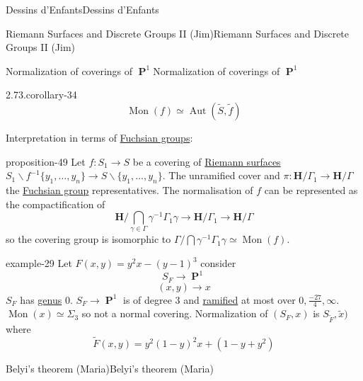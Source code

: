 \documentclass[10pt,]{book}
\numberwithin{equation}{section}
\newcommand{\inv}{^{-1}}
\newcommand{\HH}{\mathbf{H}}
\DeclareMathOperator{\PP}{\mathbf{P}}
\DeclareMathOperator{\Aut}{Aut}
\begin{document}
\begin{chapterptx}{Dessins d'Enfants}{}{Dessins d'Enfants}{}{}
\begin{sectionptx}{Riemann Surfaces and Discrete Groups II (Jim)}{}{Riemann Surfaces and Discrete Groups II (Jim)}{}{}
\begin{subsectionptx}{Normalization of coverings of \(\PP^1\)}{}{Normalization of coverings of \(\PP^1\)}{}{}
\begin{corollary}{2.73.}{}{corollary-34}
\hypertarget{p-593}{}%
%
\begin{equation*}
\operatorname{Mon}(f)  \simeq \Aut(\tilde S, \tilde f)
\end{equation*}
%
\end{corollary}
\hypertarget{p-594}{}%
Interpretation in terms of \hyperref[def-fuchsian-group]{Fuchsian groups}:%
\begin{proposition}{}{}{proposition-49}%
\hypertarget{p-595}{}%
Let \(f\colon S_1 \to S\) be a covering of \hyperref[def-top-riem-surface]{Riemann surfaces} \(S_1\smallsetminus f\inv \{ y_1, \ldots, y_n \} \to S \smallsetminus\{ y_1, \ldots, y_n \}\). The unramified cover and \(\pi \colon \HH/ \Gamma_1 \to \HH/ \Gamma\) the \hyperref[def-fuchsian-group]{Fuchsian group} representatives. The normalisation of \(f\) can be represented as the compactification of%
\begin{equation*}
\HH/ \bigcap_{\gamma \in \Gamma} \gamma \inv \Gamma_1 \gamma \to \HH/\Gamma_1 \to \HH/\Gamma
\end{equation*}
so the covering group is isomorphic to \(\Gamma/ \bigcap \gamma \inv \Gamma_1 \gamma \simeq \operatorname{Mon}(f)\).%
\end{proposition}
\begin{example}{}{example-29}%
\hypertarget{p-596}{}%
Let \(F(x,y) = y^2x - (y-1)^3\) consider%
\begin{equation*}
S_F \to \PP^1
\end{equation*}
%
\begin{equation*}
(x,y) \to x
\end{equation*}
\(S_F\) has \hyperref[def-class-set]{genus} 0. \(S_F \to \PP^1\) is of degree 3 and \hyperref[def-dess-ramified]{ramified} at most over \(0, \frac{-27}{4}, \infty\). \(\operatorname{Mon}(x)  \simeq \Sigma_3\) so not a normal covering. Normalization of \((S_F, x)\) is \(S_{\tilde F} , \tilde x)\) where%
\begin{equation*}
\tilde F (x,y) = y^2 ( 1-y)^2 x +  (1-y + y^2)
\end{equation*}
%
\end{example}
\end{subsectionptx}
\end{sectionptx}
%
%
\typeout{************************************************}
\typeout{************************************************}
%
\begin{sectionptx}{Belyi's theorem (Maria)}{}{Belyi's theorem (Maria)}{}{}\label{sec-belyi-thm}
\begin{introduction}{}%

\end{introduction}
\end{sectionptx}
\end{chapterptx}
\end{document}
